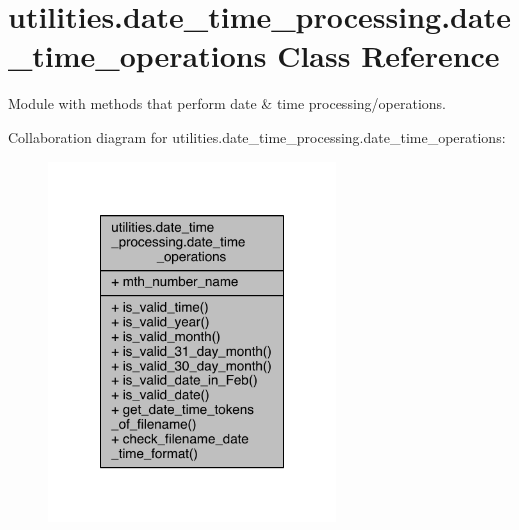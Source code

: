 \hypertarget{classutilities_1_1date__time__processing_1_1date__time__operations}{}\section{utilities.\+date\+\_\+time\+\_\+processing.\+date\+\_\+time\+\_\+operations Class Reference}
\label{classutilities_1_1date__time__processing_1_1date__time__operations}


Module with methods that perform date \& time processing/operations.  




Collaboration diagram for utilities.\+date\+\_\+time\+\_\+processing.\+date\+\_\+time\+\_\+operations\+:
\nopagebreak
\begin{figure}[H]
\begin{center}
\leavevmode
\includegraphics[width=216pt]{d9/d70/classutilities_1_1date__time__processing_1_1date__time__operations__coll__graph}
\end{center}
\end{figure}
